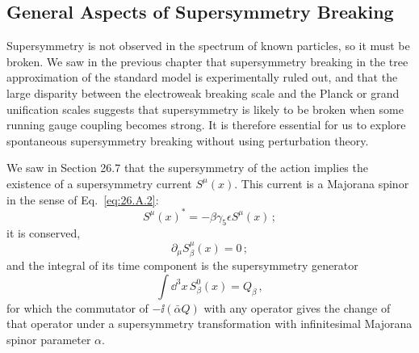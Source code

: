 
\subsection{General Aspects of Supersymmetry Breaking}

Supersymmetry is not observed in the spectrum of known particles, so it
must be broken. We saw in the previous chapter that supersymmetry breaking
in the tree approximation of the standard model is experimentally ruled
out, and that the large disparity between the electroweak breaking scale
and the Planck or grand unification scales suggests that supersymmetry is
likely to be broken when some running gauge coupling becomes strong. It is
therefore essential for us to explore spontaneous supersymmetry breaking
without using perturbation theory.

We saw in Section 26.7 that the supersymmetry of the action implies the
existence of a supersymmetry current \(S^\mu(x)\). This current is a
Majorana spinor in the sense of Eq.~\eqref{eq:26.A.2}:
\begin{equation}
  S^\mu(x)^*
  =-\beta\gamma_5\epsilon S^\mu(x)\,;
  \tag{29.1.1}\label{eq:29.1.1}
\end{equation}
it is conserved,
\begin{equation}
  \partial_\mu S^\mu_\beta(x)=0\,;
  \tag{29.1.2}\label{eq:29.1.2}
\end{equation}
and the integral of its time component is the supersymmetry generator
\begin{equation}
  \int \dd^3x\,S^0_\beta(x)=Q_\beta\,,
  \tag{29.1.3}\label{eq:29.1.3}
\end{equation}
for which the commutator of \(-\ii(\bar\alpha Q)\) with any operator gives
the change of that operator under a supersymmetry transformation with
infinitesimal Majorana spinor parameter \(\alpha\).

